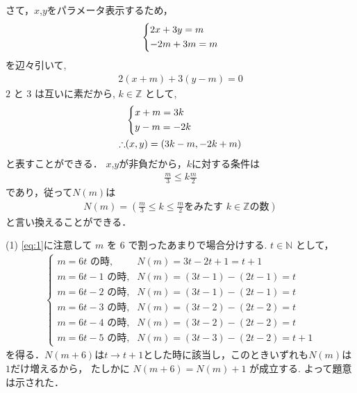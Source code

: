 \documentclass[a4paper,10pt]{ltjsarticle}
\begin{document}
\begin{multicols}{2}
  さて，$x$,$y$をパラメータ表示するため，
  \begin{align*}
    \begin{dcases}
      2x+3y=m \\
      -2m+3m=m
    \end{dcases}
  \end{align*}
  を辺々引いて,
  \begin{align*}
    2(x+m)+3(y-m)=0
  \end{align*}
  $2$ と $3$ は互いに素だから, $k \in \mathbb{Z}$ として,
  \begin{align*}
     & \begin{dcases}
         x+m = 3k \\
         y-m = -2k
       \end{dcases}         \\
    \therefore
     & (x,y) = (3k-m, -2k+m)
  \end{align*}
  と表すことができる．
  $x$,$y$が非負だから，$k$に対する条件は
  \begin{align*}
    \frac{m}{3} \le k \frac{m}{2}
  \end{align*}
  であり，従って$N(m)$は
  \begin{align}
    N(m) = \left(\frac{m}{3} \le k \le \frac{m}{2} \text{をみたす } k \in \mathbb{Z} \text{の数}\right) \label{eq:1}
  \end{align}
  と言い換えることができる．

  \vspace{10pt}
  (1)
  \cref{eq:1}に注意して $m$ を $6$ で割ったあまりで場合分けする.
  $t \in \mathbb{N}$ として，
  \begin{align}
    \begin{cases}
      m=6t \text{ の時,}   & N(m) = 3t-2t+1 = t+1       \\
      m=6t-1 \text{ の時,} & N(m) = (3t-1)-(2t-1) = t   \\
      m=6t-2 \text{ の時,} & N(m) = (3t-1)-(2t-1) = t   \\
      m=6t-3 \text{ の時,} & N(m) = (3t-2)-(2t-2) = t   \\
      m=6t-4 \text{ の時,} & N(m) = (3t-2)-(2t-2) = t   \\
      m=6t-5 \text{ の時,} & N(m) = (3t-3)-(2t-2) = t+1
    \end{cases}\label{eq:2}
  \end{align}
  を得る．$N(m+6)$は$t\to t+1$とした時に該当し，このときいずれも$N(m)$は$1$だけ増えるから，
  たしかに $N(m+6) = N(m)+1$ が成立する.
  よって題意は示された．


\end{multicols}
\end{document}
